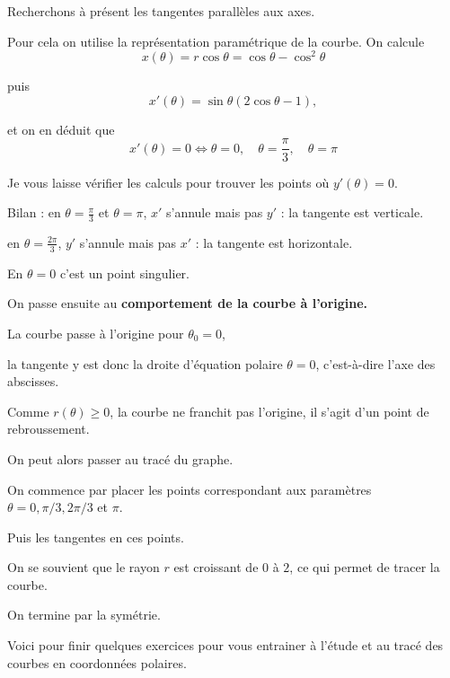 \change
 Recherchons à présent les tangentes parallèles aux axes.

 \change
Pour cela on utilise la représentation paramétrique de la courbe.
On calcule
  $$x(\theta) = r \cos \theta = \cos \theta - \cos^2\theta $$ 

 \change  
  puis
 $$ x'(\theta) = \sin\theta ( 2\cos\theta -1),$$ 
 
 
 \change
 
 et on en déduit que
  $$x'(\theta) = 0 \iff \theta = 0, \quad \theta = \frac\pi3, \quad \theta = \pi$$
 
 \change
 
 \change
 
 \change
 
 \change 
 Je vous laisse  vérifier les calculs pour trouver 
 les points où $y'(\theta)=0$.
 
 Bilan :  en $\theta = \frac\pi3$ et $\theta = \pi$, $x'$ s'annule mais pas $y'$ : 
 la tangente est verticale.
 
 en $\theta = \frac{2\pi}{3}$, $y'$ s'annule mais pas $x'$ : 
 la tangente est horizontale.

 En $\theta=0$ c'est un point singulier.
 
\diapo

On passe ensuite au \textbf{comportement de la courbe à l'origine.} 

\change
La courbe passe à l'origine   
pour $\theta_0=0$,

  \change
la tangente y est donc 
la droite d'équation polaire $\theta=0$, 
c'est-à-dire l'axe des abscisses.  

  \change
Comme $r(\theta)\ge0$, la courbe ne franchit pas l'origine, 
il s'agit d'un point de rebroussement.

  \change

  On peut alors passer au tracé du graphe.
  
  \change
  
  On commence par placer les points correspondant aux paramètres
  $\theta = 0 , \pi/3, 2\pi/3$ et $\pi$.
  
  \change
  Puis les tangentes en ces points.
  
  \change
  On se souvient que le rayon $r$ est croissant de $0$ à $2$,
  ce qui permet de tracer la courbe.
   
  \change
  On termine par la symétrie.
 







\diapo

Voici pour finir quelques exercices pour vous 
entrainer à l'étude et au tracé des courbes en coordonnées polaires.



